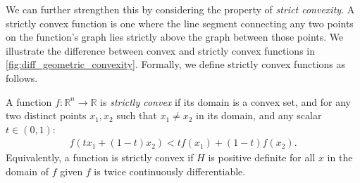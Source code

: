 We can further strengthen this by considering the property of \textit{strict convexity}. A strictly convex function is one where the line segment connecting any two points on the function's graph lies strictly above the graph between those points. We illustrate the difference between convex and strictly convex functions in \cref{fig:diff_geometric_convexity}. Formally, we define strictly convex functions as follows.
\begin{definition}
    A function $f: \mathbb{R}^n \to \mathbb{R}$ is \textit{strictly convex} if its domain is a convex set, and for any two distinct points $x_1, x_2$ such that $x_1 \neq x_2$ in its domain, and any scalar $t \in (0, 1)$:
    \begin{align}
        f(t x_1 + (1-t)x_2) < t f(x_1) + (1-t)f(x_2).
    \end{align}
    Equivalently, a function is strictly convex if $H$ is positive definite for all $x$ in the domain of $f$ given $f$ is twice continuously differentiable.
\end{definition}

